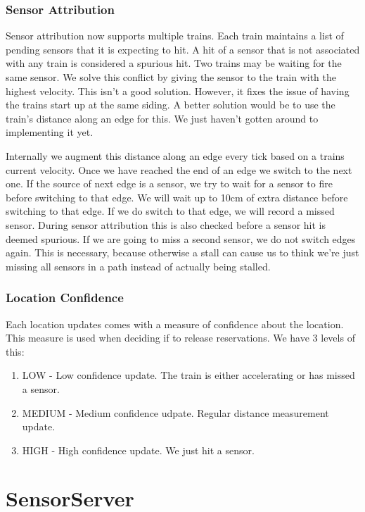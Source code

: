 \documentclass{article}
\begin{document}
\subsubsection{Sensor Attribution}

Sensor attribution now supports multiple trains. Each train maintains a list of pending sensors that it is expecting to hit. A hit of a sensor that is not associated with any train is considered a spurious hit. Two trains may be waiting for the same sensor. We solve this conflict by giving the sensor to the train with the highest velocity. This isn't a good solution. However, it fixes the issue of having the trains start up at the same siding. A better solution would be to use the train's distance along an edge for this. We just haven't gotten around to implementing it yet.

Internally we augment this distance along an edge every tick based on a trains current velocity. Once we have reached the end of an edge we switch to the next one. If the source of next edge is a sensor, we try to wait for a sensor to fire before switching to that edge. We will wait up to 10cm of extra distance before switching to that edge. If we do switch to that edge, we will record a missed sensor. During sensor attribution this is also checked before a sensor hit is deemed spurious. If we are going to miss a second sensor, we do not switch edges again. This is necessary, because otherwise a stall can cause us to think we're just missing all sensors in a path instead of actually being stalled.

\subsubsection{Location Confidence}

Each location updates comes with a measure of confidence about the location. This measure is used when deciding if to release reservations. We have 3 levels of this:
\begin{enumerate}
  \item LOW - Low confidence update. The train is either accelerating or has missed a sensor.
  \item MEDIUM - Medium confidence udpate. Regular distance measurement update.
  \item HIGH - High confidence update. We just hit a sensor.
\end{enumerate}

\section{SensorServer}
\end{document}
